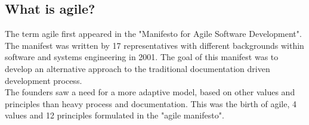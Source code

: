 \newpage
\subsection{What is agile?}

The term agile first appeared in the "Manifesto for Agile Software Development"\cite{agileManifesto}. The manifest was written by 17 representatives with different backgrounds within software and systems engineering in 2001. The goal of this manifest was to develop an alternative approach to the traditional documentation driven development process.
\\
\newline
The founders saw a need for a more adaptive model, based on other values and principles than heavy process and documentation. This was the birth of agile, 4 values and 12 principles formulated in the "agile manifesto". 


